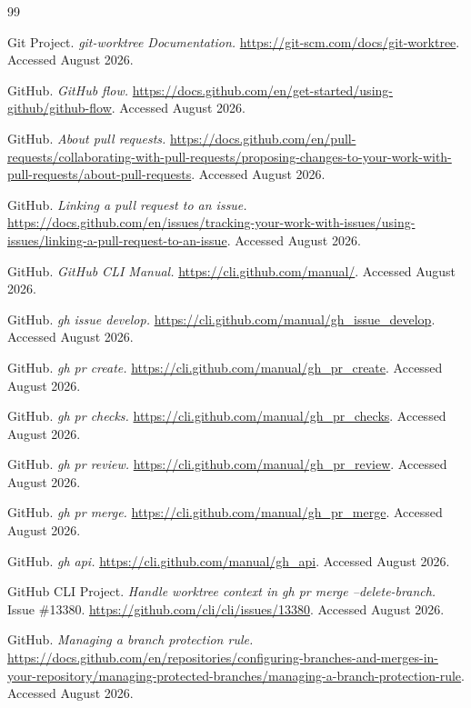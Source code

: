 \documentclass[11pt]{article}
\begin{document}
\begin{thebibliography}{99}

Git Project. \textit{git-worktree Documentation.}
\url{https://git-scm.com/docs/git-worktree}. Accessed August 2026.

GitHub. \textit{GitHub flow.}
\url{https://docs.github.com/en/get-started/using-github/github-flow}. Accessed August 2026.

GitHub. \textit{About pull requests.}
\url{https://docs.github.com/en/pull-requests/collaborating-with-pull-requests/proposing-changes-to-your-work-with-pull-requests/about-pull-requests}.
Accessed August 2026.

GitHub. \textit{Linking a pull request to an issue.}
\url{https://docs.github.com/en/issues/tracking-your-work-with-issues/using-issues/linking-a-pull-request-to-an-issue}.
Accessed August 2026.

GitHub. \textit{GitHub CLI Manual.} \url{https://cli.github.com/manual/}. Accessed August 2026.

GitHub. \textit{gh issue develop.} \url{https://cli.github.com/manual/gh_issue_develop}.
Accessed August 2026.

GitHub. \textit{gh pr create.} \url{https://cli.github.com/manual/gh_pr_create}.
Accessed August 2026.

GitHub. \textit{gh pr checks.} \url{https://cli.github.com/manual/gh_pr_checks}.
Accessed August 2026.

GitHub. \textit{gh pr review.} \url{https://cli.github.com/manual/gh_pr_review}.
Accessed August 2026.

GitHub. \textit{gh pr merge.} \url{https://cli.github.com/manual/gh_pr_merge}.
Accessed August 2026.

GitHub. \textit{gh api.} \url{https://cli.github.com/manual/gh_api}. Accessed August 2026.

GitHub CLI Project. \textit{Handle worktree context in gh pr merge --delete-branch.}
Issue \#13380. \url{https://github.com/cli/cli/issues/13380}. Accessed August 2026.

GitHub. \textit{Managing a branch protection rule.}
\url{https://docs.github.com/en/repositories/configuring-branches-and-merges-in-your-repository/managing-protected-branches/managing-a-branch-protection-rule}.
Accessed August 2026.


\end{thebibliography}
\end{document}
